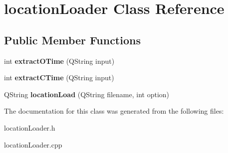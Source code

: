 \hypertarget{classlocation_loader}{\section{location\-Loader Class Reference}
\label{classlocation_loader}
}
\subsection*{Public Member Functions}
\begin{DoxyCompactItemize}
\item 
\hypertarget{classlocation_loader_ac04f41072f73e10521abd3b320d3b345}{int {\bfseries extract\-O\-Time} (Q\-String input)}\label{classlocation_loader_ac04f41072f73e10521abd3b320d3b345}

\item 
\hypertarget{classlocation_loader_a8067d9ac015d2973deeb0f0ba13c0c8a}{int {\bfseries extract\-C\-Time} (Q\-String input)}\label{classlocation_loader_a8067d9ac015d2973deeb0f0ba13c0c8a}

\item 
\hypertarget{classlocation_loader_ae3c8d2242868ca7dd3ee02c77f77fdbe}{Q\-String {\bfseries location\-Load} (Q\-String filename, int option)}\label{classlocation_loader_ae3c8d2242868ca7dd3ee02c77f77fdbe}

\end{DoxyCompactItemize}


The documentation for this class was generated from the following files\-:\begin{DoxyCompactItemize}
\item 
location\-Loader.\-h\item 
location\-Loader.\-cpp\end{DoxyCompactItemize}
